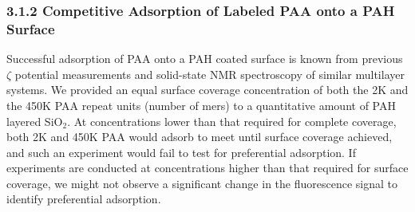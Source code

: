 \documentclass[journal=mamobx,manuscript=article]{achemso}
\begin{document}
\subsubsection{3.1.2 Competitive Adsorption of Labeled PAA onto a PAH Surface}   %
    \label{sec-res-compet}


Successful adsorption of PAA onto a PAH coated surface is known from previous $\zeta$ potential measurements and solid-state NMR spectroscopy of similar multilayer systems.\cite{Burke2003,Smith2004}  We provided an equal surface coverage concentration of both the 2K and the 450K PAA repeat units (number of mers) to a quantitative amount of PAH layered SiO$_2$.  At concentrations lower than that required for complete coverage, both 2K and 450K PAA would adsorb to meet until surface coverage achieved, and such an experiment would fail to test for preferential adsorption.  If experiments are conducted at concentrations higher than that required for surface coverage, we might not observe a significant change in the 
fluorescence signal to identify preferential adsorption. 

\end{document}
